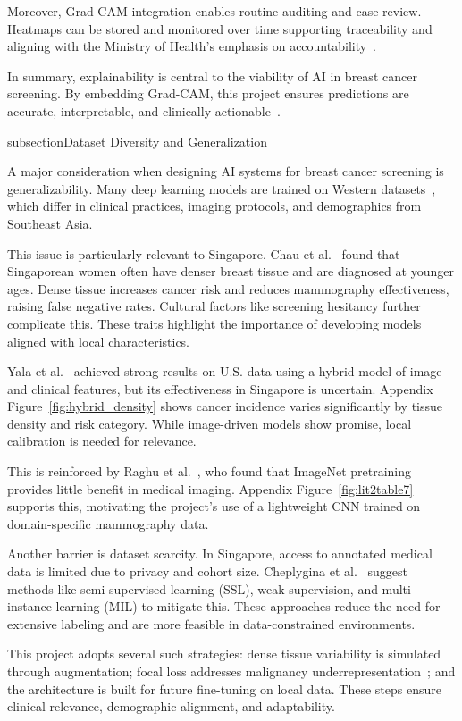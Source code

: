 \documentclass[12pt]{article}
\begin{document}
Moreover, Grad-CAM integration enables routine auditing and case review. Heatmaps can be stored and monitored over time supporting traceability and aligning with the Ministry of Health’s emphasis on accountability~\cite{6}.

In summary, explainability is central to the viability of AI in breast cancer screening. By embedding Grad-CAM, this project ensures predictions are accurate, interpretable, and clinically actionable~\cite{5}.

subsection{Dataset Diversity and Generalization}

A major consideration when designing AI systems for breast cancer screening is generalizability. Many deep learning models are trained on Western datasets~\cite{1}, which differ in clinical practices, imaging protocols, and demographics from Southeast Asia.

This issue is particularly relevant to Singapore. Chau et al.~\cite{6} found that Singaporean women often have denser breast tissue and are diagnosed at younger ages. Dense tissue increases cancer risk and reduces mammography effectiveness, raising false negative rates. Cultural factors like screening hesitancy further complicate this. These traits highlight the importance of developing models aligned with local characteristics.

Yala et al.~\cite{1} achieved strong results on U.S. data using a hybrid model of image and clinical features, but its effectiveness in Singapore is uncertain. Appendix Figure~\ref{fig:hybrid_density} shows cancer incidence varies significantly by tissue density and risk category. While image-driven models show promise, local calibration is needed for relevance.

This is reinforced by Raghu et al.~\cite{2}, who found that ImageNet pretraining provides little benefit in medical imaging. Appendix Figure~\ref{fig:lit2table7} supports this, motivating the project’s use of a lightweight CNN trained on domain-specific mammography data.

Another barrier is dataset scarcity. In Singapore, access to annotated medical data is limited due to privacy and cohort size. Cheplygina et al.~\cite{4} suggest methods like semi-supervised learning (SSL), weak supervision, and multi-instance learning (MIL) to mitigate this. These approaches reduce the need for extensive labeling and are more feasible in data-constrained environments.

This project adopts several such strategies: dense tissue variability is simulated through augmentation; focal loss addresses malignancy underrepresentation~\cite{2}; and the architecture is built for future fine-tuning on local data. These steps ensure clinical relevance, demographic alignment, and adaptability.
\end{document}
